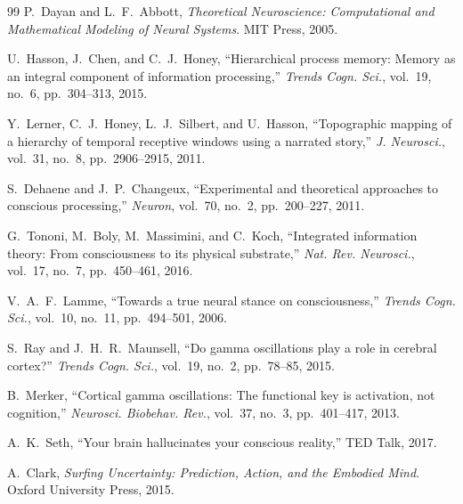 \documentclass[12pt,a4paper]{article}
\theoremstyle{remark}
\begin{document}
\begin{thebibliography}{99}
P.~Dayan and L.~F.~Abbott, \emph{Theoretical Neuroscience: Computational
and Mathematical Modeling of Neural Systems}. MIT Press, 2005.

U.~Hasson, J.~Chen, and C.~J.~Honey, ``Hierarchical process memory: Memory
as an integral component of information processing,''
\emph{Trends Cogn. Sci.}, vol.~19, no.~6, pp.~304--313, 2015.

Y.~Lerner, C.~J.~Honey, L.~J.~Silbert, and U.~Hasson, ``Topographic mapping
of a hierarchy of temporal receptive windows using a narrated story,''
\emph{J. Neurosci.}, vol.~31, no.~8, pp.~2906--2915, 2011.

S.~Dehaene and J.~P.~Changeux, ``Experimental and theoretical approaches to
conscious processing,'' \emph{Neuron}, vol.~70, no.~2, pp.~200--227, 2011.

G.~Tononi, M.~Boly, M.~Massimini, and C.~Koch, ``Integrated information
theory: From consciousness to its physical substrate,''
\emph{Nat. Rev. Neurosci.}, vol.~17, no.~7, pp.~450--461, 2016.

V.~A.~F.~Lamme, ``Towards a true neural stance on consciousness,''
\emph{Trends Cogn. Sci.}, vol.~10, no.~11, pp.~494--501, 2006.

S.~Ray and J.~H.~R.~Maunsell, ``Do gamma oscillations play a role in
cerebral cortex?'' \emph{Trends Cogn. Sci.}, vol.~19, no.~2, pp.~78--85,
2015.

B.~Merker, ``Cortical gamma oscillations: The functional key is activation,
not cognition,'' \emph{Neurosci. Biobehav. Rev.}, vol.~37, no.~3,
pp.~401--417, 2013.

A.~K.~Seth, ``Your brain hallucinates your conscious reality,''
TED Talk, 2017.

A.~Clark, \emph{Surfing Uncertainty: Prediction, Action, and the Embodied
Mind}. Oxford University Press, 2015.

\end{thebibliography}
\end{document}
